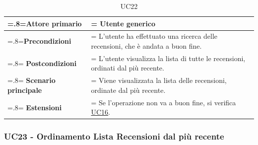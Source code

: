             \begin{table}[H]
                \centering
                \renewcommand{\arraystretch}{1.8}
                \renewcommand\tabularxcolumn[1]{m{#1}}
                \begin{tabularx}{0.9\textwidth} {
                    >{\hsize=.8\hsize\linewidth=\hsize}X
                    >{\hsize=1.2\hsize\linewidth=\hsize}X}
                    \hline
                    \textbf{Attore primario} & Utente generico \\
                    \hline
                    \textbf{Precondizioni} & L'utente ha effettuato una ricerca delle recensioni, che è andata a buon fine. \\
                    \hline
                    \textbf{Postcondizioni} & L'utente visualizza la lista di tutte le recensioni, ordinati dal più recente. \\
                    \hline
                    \textbf{Scenario principale} & Viene visualizzata la lista delle recensioni, ordinate dal più recente. \\
                    \hline
                    \textbf{Estensioni} & Se l'operazione non va a buon fine, si verifica \hyperref[UC16]{UC16}. \\
                    \hline
                \end{tabularx}
                \caption{UC22}
            \end{table}

            \subsubsection{UC23 - Ordinamento Lista Recensioni dal più recente}
            \label{UC23}

